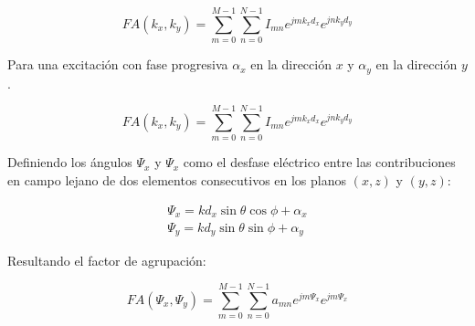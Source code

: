 \begin{equation}
	FA (k_{x},k_{y}) =\sum_{m=0}^{M-1} \sum_{n=0}^{N-1} I_{mn}e^{jmk_{x}d_{x}}e^{jnk_{y}d_{y}}
	\label{eq:fabinom}
\end{equation}

\par Para una excitación con fase progresiva $\alpha_{x}$ en la dirección $x$ y $\alpha_{y}$ en la dirección $y$. \cite{Cardama2002}

\begin{equation}
	FA (k_{x},k_{y}) =\sum_{m=0}^{M-1} \sum_{n=0}^{N-1} I_{mn}e^{jmk_{x}d_{x}}e^{jnk_{y}d_{y}}
	\label{eq:excitbinom}
\end{equation}

\par Definiendo los ángulos $\Psi_{x}$ y $\Psi_{x}$ como el desfase eléctrico entre las contribuciones en campo lejano de dos elementos consecutivos en los planos $(x,z)$ y $(y,z)$: \cite{Cardama2002}

\begin{equation}
	\begin{matrix}
\Psi_{x}=kd_{x}\sin\theta\cos\phi+\alpha_{x}
 \\
\Psi_{y}=kd_{y}\sin\theta\sin\phi+\alpha_{y}
\end{matrix}
	\label{eq:sinsin}
\end{equation}

\par Resultando el factor de agrupación: \cite{Cardama2002}

\begin{equation}
	FA (\Psi_{x},\Psi_{y}) =\sum_{m=0}^{M-1} \sum_{n=0}^{N-1} a_{mn}e^{jm\Psi_{x}}e^{jm\Psi_{x}}
	\label{eq:fatipo2}
\end{equation}

